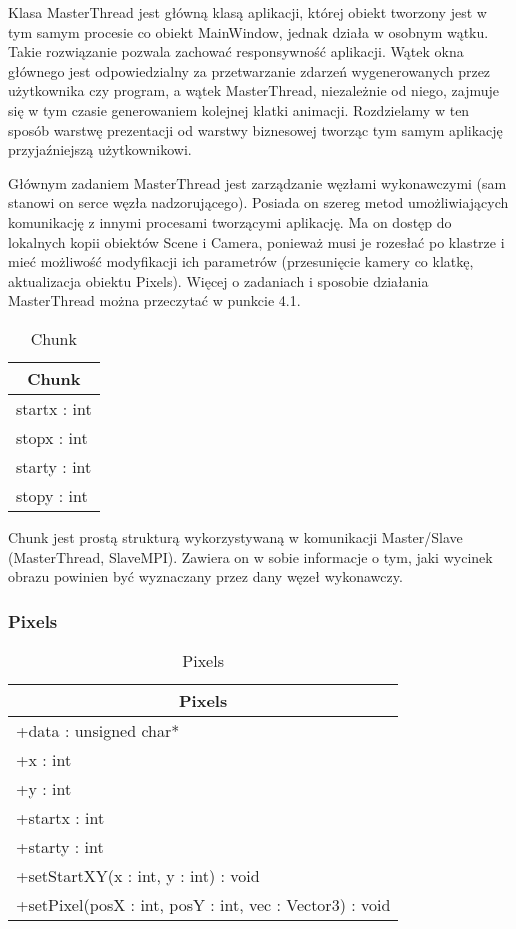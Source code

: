 Klasa MasterThread jest główną klasą aplikacji, której obiekt tworzony jest w tym samym procesie co obiekt MainWindow, jednak działa w osobnym wątku. Takie rozwiązanie pozwala zachować responsywność aplikacji. Wątek okna głównego jest odpowiedzialny za przetwarzanie zdarzeń wygenerowanych przez użytkownika czy program, a wątek MasterThread, niezależnie od niego, zajmuje się w tym czasie generowaniem kolejnej klatki animacji. Rozdzielamy w ten sposób warstwę prezentacji od warstwy biznesowej tworząc tym samym aplikację przyjaźniejszą użytkownikowi.

Głównym zadaniem MasterThread jest zarządzanie węzłami wykonawczymi (sam stanowi on serce węzła nadzorującego). Posiada on szereg metod umożliwiających komunikację z innymi procesami tworzącymi aplikację. Ma on dostęp do lokalnych kopii obiektów Scene i Camera, ponieważ musi je rozesłać po klastrze i mieć możliwość modyfikacji ich parametrów (przesunięcie kamery co klatkę, aktualizacja obiektu Pixels). Więcej o zadaniach i sposobie działania MasterThread można przeczytać w punkcie 4.1.

\footnotesize
\begin{longtable}{|p{14cm}|}
    \caption{Chunk} \label{tab:Chunk (struktura} \\ \hline
    \multicolumn{1}{|c|}{Chunk} \\ \hline
    startx : int \\
    stopx : int \\
    starty : int \\
    stopy : int \\
    \hline
\end{longtable}
\normalsize

Chunk jest prostą strukturą wykorzystywaną w komunikacji Master/Slave (MasterThread, SlaveMPI). Zawiera on w sobie informacje o tym, jaki wycinek obrazu powinien być wyznaczany przez dany węzeł wykonawczy.

\subsubsection{Pixels}

\footnotesize
\begin{longtable}{|p{14cm}|}
    \caption{Pixels} \label{tab:Pixels} \\ \hline
    \multicolumn{1}{|c|}{Pixels} \\ \hline
    +data : unsigned char* \\
    +x : int \\
    +y : int \\ 
    +startx : int \\
    +starty : int \\
    \hline
	+setStartXY(x : int, y : int) : void \\
	+setPixel(posX : int, posY : int, vec : Vector3) : void \\
	\hline
\end{longtable}
\normalsize

